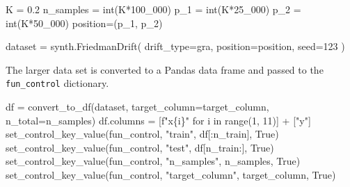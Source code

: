 \documentclass[
  letterpaper,
  DIV=11,
  numbers=noendperiod]{scrreprt}
\newenvironment{Shaded}{\begin{snugshade}}{\end{snugshade}}
\newcommand{\BuiltInTok}[1]{\textcolor[rgb]{0.00,0.23,0.31}{#1}}
\newcommand{\ControlFlowTok}[1]{\textcolor[rgb]{0.00,0.23,0.31}{#1}}
\newcommand{\DecValTok}[1]{\textcolor[rgb]{0.68,0.00,0.00}{#1}}
\newcommand{\FloatTok}[1]{\textcolor[rgb]{0.68,0.00,0.00}{#1}}
\newcommand{\KeywordTok}[1]{\textcolor[rgb]{0.00,0.23,0.31}{#1}}
\newcommand{\NormalTok}[1]{\textcolor[rgb]{0.00,0.23,0.31}{#1}}
\newcommand{\OperatorTok}[1]{\textcolor[rgb]{0.37,0.37,0.37}{#1}}
\newcommand{\SpecialCharTok}[1]{\textcolor[rgb]{0.37,0.37,0.37}{#1}}
\newcommand{\SpecialStringTok}[1]{\textcolor[rgb]{0.13,0.47,0.30}{#1}}
\newcommand{\StringTok}[1]{\textcolor[rgb]{0.13,0.47,0.30}{#1}}
\newcommand{\VariableTok}[1]{\textcolor[rgb]{0.07,0.07,0.07}{#1}}
\begin{document}
\begin{Shaded}
\begin{Highlighting}[]
\NormalTok{K }\OperatorTok{=} \FloatTok{0.2}
\NormalTok{n\_samples }\OperatorTok{=} \BuiltInTok{int}\NormalTok{(K}\OperatorTok{*}\DecValTok{100\_000}\NormalTok{)}
\NormalTok{p\_1 }\OperatorTok{=} \BuiltInTok{int}\NormalTok{(K}\OperatorTok{*}\DecValTok{25\_000}\NormalTok{)}
\NormalTok{p\_2 }\OperatorTok{=} \BuiltInTok{int}\NormalTok{(K}\OperatorTok{*}\DecValTok{50\_000}\NormalTok{)}
\NormalTok{position}\OperatorTok{=}\NormalTok{(p\_1, p\_2)}
\end{Highlighting}
\end{Shaded}

\begin{Shaded}
\begin{Highlighting}[]
\NormalTok{dataset }\OperatorTok{=}\NormalTok{ synth.FriedmanDrift(}
\NormalTok{   drift\_type}\OperatorTok{=}\StringTok{\textquotesingle{}gra\textquotesingle{}}\NormalTok{,}
\NormalTok{   position}\OperatorTok{=}\NormalTok{position,}
\NormalTok{   seed}\OperatorTok{=}\DecValTok{123}
\NormalTok{)}
\end{Highlighting}
\end{Shaded}

The larger data set is converted to a Pandas data frame and passed to
the \texttt{fun\_control} dictionary.

\begin{Shaded}
\begin{Highlighting}[]
\NormalTok{df }\OperatorTok{=}\NormalTok{ convert\_to\_df(dataset, target\_column}\OperatorTok{=}\NormalTok{target\_column, n\_total}\OperatorTok{=}\NormalTok{n\_samples)}
\NormalTok{df.columns }\OperatorTok{=}\NormalTok{ [}\SpecialStringTok{f"x}\SpecialCharTok{\{}\NormalTok{i}\SpecialCharTok{\}}\SpecialStringTok{"} \ControlFlowTok{for}\NormalTok{ i }\KeywordTok{in} \BuiltInTok{range}\NormalTok{(}\DecValTok{1}\NormalTok{, }\DecValTok{11}\NormalTok{)] }\OperatorTok{+}\NormalTok{ [}\StringTok{"y"}\NormalTok{]}
\NormalTok{set\_control\_key\_value(fun\_control, }\StringTok{"train"}\NormalTok{, df[:n\_train], }\VariableTok{True}\NormalTok{)}
\NormalTok{set\_control\_key\_value(fun\_control, }\StringTok{"test"}\NormalTok{, df[n\_train:], }\VariableTok{True}\NormalTok{)}
\NormalTok{set\_control\_key\_value(fun\_control, }\StringTok{"n\_samples"}\NormalTok{, n\_samples, }\VariableTok{True}\NormalTok{)}
\NormalTok{set\_control\_key\_value(fun\_control, }\StringTok{"target\_column"}\NormalTok{, target\_column, }\VariableTok{True}\NormalTok{)}
\end{Highlighting}
\end{Shaded}
\end{document}
